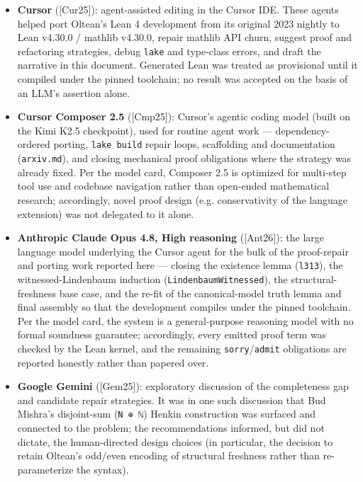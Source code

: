 \documentclass[11pt,a4paper]{article}
\renewcommand{\_}{\origtextunderscore\allowbreak}
\begin{document}
\begin{itemize}
\item
  \textbf{Cursor} ({[}Cur25{]}): agent-assisted editing in the Cursor IDE. These agents helped port Oltean's Lean 4 development from its original 2023 nightly to Lean v4.30.0 / mathlib v4.30.0, repair mathlib API churn, suggest proof and refactoring strategies, debug \texttt{lake} and type-class errors, and draft the narrative in this document. Generated Lean was treated as provisional until it compiled under the pinned toolchain; no result was accepted on the basis of an LLM's assertion alone.
\item
  \textbf{Cursor Composer 2.5} ({[}Cmp25{]}): Cursor's agentic coding model (built on the Kimi K2.5 checkpoint), used for routine agent work --- dependency-ordered porting, \texttt{lake\ build} repair loops, scaffolding and documentation (\texttt{arxiv.md}), and closing mechanical proof obligations where the strategy was already fixed. Per the model card, Composer 2.5 is optimized for multi-step tool use and codebase navigation rather than open-ended mathematical research; accordingly, novel proof design (e.g. conservativity of the language extension) was not delegated to it alone.
\item
  \textbf{Anthropic Claude Opus 4.8, High reasoning} ({[}Ant26{]}): the large language model underlying the Cursor agent for the bulk of the proof-repair and porting work reported here --- closing the existence lemma (\texttt{l313\textquotesingle{}}), the witnessed-Lindenbaum induction (\texttt{LindenbaumWitnessed}), the structural-freshness base case, and the re-fit of the canonical-model truth lemma and final assembly so that the development compiles under the pinned toolchain. Per the model card, the system is a general-purpose reasoning model with no formal soundness guarantee; accordingly, every emitted proof term was checked by the Lean kernel, and the remaining \texttt{sorry}/\texttt{admit} obligations are reported honestly rather than papered over.
\item
  \textbf{Google Gemini} ({[}Gem25{]}): exploratory discussion of the completeness gap and candidate repair strategies. It was in one such discussion that Bud Mishra's disjoint-sum (\texttt{N\ ⊕\ ℕ}) Henkin construction was surfaced and connected to the problem; the recommendations informed, but did not dictate, the human-directed design choices (in particular, the decision to retain Oltean's odd/even encoding of structural freshness rather than re-parameterize the syntax).
\end{itemize}
\end{document}

